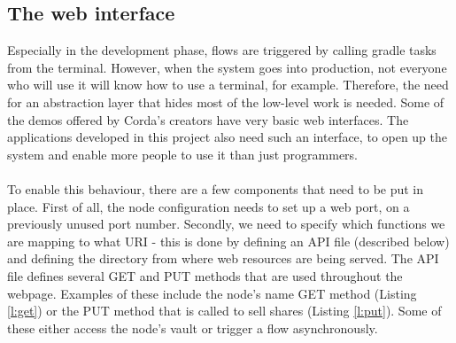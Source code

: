 \documentclass[12pt,twoside]{article}
\begin{document}
\subsection{The web interface}
\label{sub:web}
Especially in the development phase, flows are triggered by calling gradle tasks from the terminal. However, when the system goes into production, not everyone who will use it will know how to use a terminal, for example. Therefore, the need for an abstraction layer that hides most of the low-level work is needed. Some of the demos offered by Corda's creators have very basic web interfaces. The applications developed in this project also need such an interface, to open up the system and enable more people to use it than just programmers.
\\ \\
To enable this behaviour, there are a few components that need to be put in place. First of all, the node configuration needs to set up a web port, on a previously unused port number. Secondly, we need to specify which functions we are mapping to what URI - this is done by defining an API file (described below) and defining the directory from where web resources are being served. The API file defines several GET and PUT methods that are used throughout the webpage. Examples of these include the node's name GET method (Listing \ref{l:get}) or the PUT method that is called to sell shares (Listing \ref{l:put}). Some of these either access the node's vault or trigger a flow asynchronously.


\end{document}
